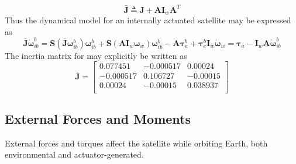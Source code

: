 \begin{equation}
     \bar{\mathbf{J}} \triangleq \mathbf{J}+\mathbf{A}\mathbf{I}_w\mathbf{A}^T
\end{equation}
Thus the dynamical model for an internally actuated satellite may be expressed as
\begin{subequations}
\begin{equation}
      \bar{\mathbf{J}}\dot{\boldsymbol{\omega}}^{b}_{ib}=\mathbf{S}\left (\bar{\mathbf{J}}\boldsymbol{\omega}^b_{ib}\right )\boldsymbol{\omega}^b_{ib}+\mathbf{S}\left (\mathbf{A}\mathbf{I}_w\boldsymbol{\omega}_w\right )\boldsymbol{\omega}^b_{ib}-\mathbf{A}\boldsymbol{\tau}^b_a+\boldsymbol{\tau}^b_e
    \end{equation}
    \begin{equation}
      \mathbf{I}_w\dot{\boldsymbol{\omega}}_w= \boldsymbol{\tau}_a-\mathbf{I}_w\mathbf{A}\dot{\boldsymbol{\omega}}^b_{ib}
      \end{equation}
\end{subequations}
The inertia matrix for \hypso may explicitly be written as
\begin{equation}
    \bar{\mathbf{J}} = \begin{bmatrix}
			0.077451 & -0.000517 & 0.00024 \\
-0.000517 & 0.106727 & -0.00015 \\
0.00024 & -0.00015 & 0.038937 \\
    \end{bmatrix}
		\end{equation}
\subsection{External Forces and Moments}
External forces and torques affect the satellite while orbiting Earth, both environmental and actuator-generated.

